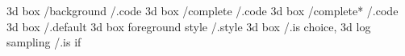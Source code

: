 3d box                 /background /.code
3d box                 /complete   /.code
3d box                 /complete*  /.code
3d box                             /.default   
3d box foreground style            /.style     
3d box                             /.is choice,
3d log sampling                    /.is if     

